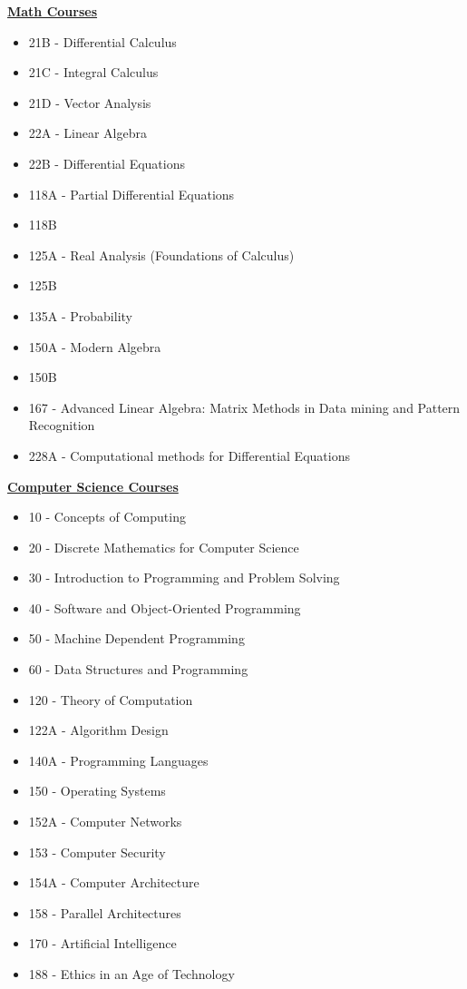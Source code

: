 \documentclass[11pt]{ltxdoc}
\begin{document}
\noindent
\textbf{\underline{Math Courses}}
\begin{itemize}
  \item 21B - Differential Calculus
  \item 21C - Integral Calculus
  \item 21D - Vector Analysis
  \item 22A - Linear Algebra
  \item 22B - Differential Equations
  \item 118A - Partial Differential Equations
  \item 118B
  \item 125A - Real Analysis (Foundations of Calculus)
  \item 125B
  \item 135A - Probability
  \item 150A - Modern Algebra
  \item 150B
  \item 167 - Advanced Linear Algebra: Matrix Methods in Data mining and Pattern Recognition
  \item 228A - Computational methods for Differential Equations
\end{itemize}

\noindent
\textbf{\underline{Computer Science Courses}}
\begin{itemize}
  \item 10 - Concepts of Computing
  \item 20 - Discrete Mathematics for Computer Science
  \item 30 - Introduction to Programming and Problem Solving
  \item 40 - Software and Object-Oriented Programming
  \item 50 - Machine Dependent Programming
  \item 60 - Data Structures and Programming
  \item 120 - Theory of Computation
  \item 122A - Algorithm Design
  \item 140A - Programming Languages
  \item 150 - Operating Systems
  \item 152A - Computer Networks
  \item 153 - Computer Security
  \item 154A - Computer Architecture
  \item 158 - Parallel Architectures
  \item 170 - Artificial Intelligence
  \item 188 - Ethics in an Age of Technology
\end{itemize}
\end{document}
